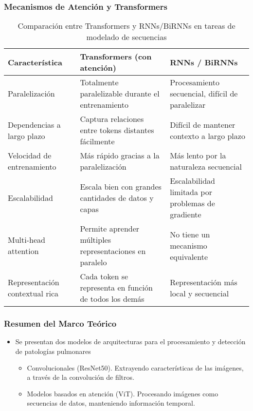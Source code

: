 \begin{frame}
\frametitle{Mecanismos de Atención y Transformers}
\begin{table}[h!]
    \centering
    \fontsize{7}{8}\selectfont
    \begin{tabular}{|p{2.5cm}|p{3cm}|p{3cm}|}
        \hline
        \textbf{Característica} & \textbf{Transformers (con atención)} & \textbf{RNNs / BiRNNs} \\
        \hline
        Paralelización & Totalmente paralelizable durante el entrenamiento & Procesamiento secuencial, difícil de paralelizar \\
        \hline
        Dependencias a largo plazo & Captura relaciones entre tokens distantes fácilmente & Difícil de mantener contexto a largo plazo \\
        \hline
        Velocidad de entrenamiento & Más rápido gracias a la paralelización & Más lento por la naturaleza secuencial \\
        \hline
        Escalabilidad & Escala bien con grandes cantidades de datos y capas & Escalabilidad limitada por problemas de gradiente \\
        \hline
        Multi-head attention & Permite aprender múltiples representaciones en paralelo & No tiene un mecanismo equivalente \\
        \hline
        Representación contextual rica & Cada token se representa en función de todos los demás & Representación más local y secuencial \\
        \hline
    \end{tabular}
    \caption{Comparación entre Transformers y RNNs/BiRNNs en tareas de modelado de secuencias}
    \label{tab:comparacion_transformers_rnns}
\end{table}
\end{frame}

\begin{frame}
\frametitle{Resumen del Marco Teórico}
\begin{itemize}
    \item Se presentan dos modelos de arquitecturas para el procesamiento y detección de patologías pulmonares
        \begin{itemize}
            \item Convolucionales (ResNet50). Extrayendo características de las imágenes, a través de la convolución de filtros.
            \item Modelos basados en atención (ViT). Procesando imágenes como secuencias de datos, manteniendo información temporal.
        \end{itemize}
\end{itemize}
\end{frame}


